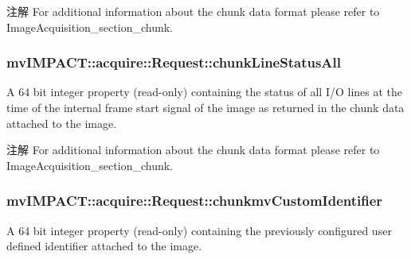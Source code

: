\begin{DoxyNote}{注解}
For additional information about the chunk data format please refer to Image\+Acquisition\+\_\+section\+\_\+chunk. 
\end{DoxyNote}
\hypertarget{classmv_i_m_p_a_c_t_1_1acquire_1_1_request_a659b5850f2db44b715b3d17af425c263}{
\subsubsection[{chunk\+Line\+Status\+All}]{ mv\+I\+M\+P\+A\+C\+T\+::acquire\+::\+Request\+::chunk\+Line\+Status\+All}}\label{classmv_i_m_p_a_c_t_1_1acquire_1_1_request_a659b5850f2db44b715b3d17af425c263}


A 64 bit integer property {\bfseries }(read-\/only) containing the status of all I/\+O lines at the time of the internal frame start signal of the image as returned in the chunk data attached to the image. 

\begin{DoxyNote}{注解}
For additional information about the chunk data format please refer to Image\+Acquisition\+\_\+section\+\_\+chunk. 
\end{DoxyNote}
\hypertarget{classmv_i_m_p_a_c_t_1_1acquire_1_1_request_a9d9f523d03a4ef82a5340f74ffc45934}{
\subsubsection[{chunkmv\+Custom\+Identifier}]{ mv\+I\+M\+P\+A\+C\+T\+::acquire\+::\+Request\+::chunkmv\+Custom\+Identifier}}\label{classmv_i_m_p_a_c_t_1_1acquire_1_1_request_a9d9f523d03a4ef82a5340f74ffc45934}


A 64 bit integer property {\bfseries }(read-\/only) containing the previously configured user defined identifier attached to the image. 

